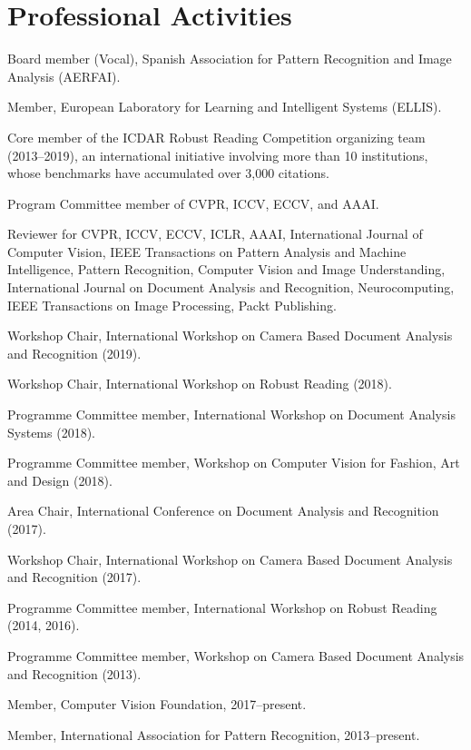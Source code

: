 \documentclass[11pt]{article}
\newenvironment{entries}{%
  \begin{list}{}{\setlength{\leftmargin}{3em}\setlength{\itemindent}{-1.5em}%
    \setlength{\itemsep}{0.35em}\setlength{\parsep}{0pt}\setlength{\topsep}{0.2em}}}%
  {\end{list}}
\begin{document}
\section*{Professional Activities}
\begin{entries}
\item Board member (Vocal), Spanish Association for Pattern Recognition and Image Analysis (AERFAI).
\item Member, European Laboratory for Learning and Intelligent Systems (ELLIS).
\item Core member of the ICDAR Robust Reading Competition organizing team (2013--2019), an international initiative involving more than 10 institutions, whose benchmarks have accumulated over 3,000 citations.
\item Program Committee member of CVPR, ICCV, ECCV, and AAAI.
\item Reviewer for CVPR, ICCV, ECCV, ICLR, AAAI, International Journal of Computer Vision, IEEE Transactions on Pattern Analysis and Machine Intelligence, Pattern Recognition, Computer Vision and Image Understanding, International Journal on Document Analysis and Recognition, Neurocomputing, IEEE Transactions on Image Processing, Packt Publishing.
\item Workshop Chair, International Workshop on Camera Based Document Analysis and Recognition (2019).
\item Workshop Chair, International Workshop on Robust Reading (2018).
\item Programme Committee member, International Workshop on Document Analysis Systems (2018).
\item Programme Committee member, Workshop on Computer Vision for Fashion, Art and Design (2018).
\item Area Chair, International Conference on Document Analysis and Recognition (2017).
\item Workshop Chair, International Workshop on Camera Based Document Analysis and Recognition (2017).
\item Programme Committee member, International Workshop on Robust Reading (2014, 2016).
\item Programme Committee member, Workshop on Camera Based Document Analysis and Recognition (2013).
\item Member, Computer Vision Foundation, 2017--present.
\item Member, International Association for Pattern Recognition, 2013--present.
\end{entries}
\end{document}
